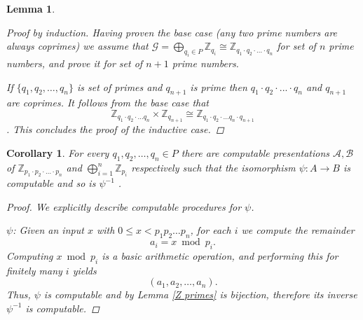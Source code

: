 \documentclass{pracalicmgr2025}
\theoremstyle{plain}            %
\newtheorem{lemma}[theorem]{Lemma}
\newtheorem{corollary}[theorem]{Corollary}
\theoremstyle{remark}           %
\theoremstyle{definition}       %
\begin{document}
\begin{lemma}
\begin{proof}[Proof by induction]
        Having proven the base case (any two prime numbers are always coprimes) we assume that $\mathcal{G} = \bigoplus_{q_i \in P}\mathbb{Z}_{q_i} \cong \mathbb{Z}_{q_1 \cdot q_2 \cdot... \cdot q_n}$ for set of $n$ prime numbers, and prove it for set of $n+1$ prime numbers. 
        
        If $\{q_1,q_2,\dots,q_n\}$ is set of primes and $q_{n+1}$ is prime then $q_1\cdot q_2\cdot...\cdot q_n$ and $q_{n+1}$ are coprimes. It follows from the base case that
        $$\mathbb{Z}_{q_1 \cdot q_2 \cdot...q_n} \times \mathbb{Z}_{q_{n+1}}\cong \mathbb{Z}_{q_1 \cdot q_2 \cdot...q_n\cdot q_{n+1}} $$.
        This concludes the proof of  the inductive case.
        
        
    \end{proof}
\end{lemma}

\begin{corollary}
For every $q_1,q_2,\dots,q_n \in P$ there are computable presentations $\mathcal{A},\mathcal{B}$ of $\mathbb{Z}_{p_1\cdot p_2 \cdot \dots \cdotp p_n}$ and $\bigoplus_{i=1}^{n} \mathbb{Z}_{p_i}$ respectively such that the isomorphism $\psi: A \to B$ is computable and so is $\psi^{-1}$ .
\begin{proof}
We explicitly describe computable procedures for $\psi$.

$\psi$: Given an input $x$ with $0 \le x < p_1p_2\dots p_n$, for each $i$ we compute the remainder 
$$
a_i = x \bmod p_i.
$$
Computing $x \bmod p_i$ is a basic arithmetic operation, and performing this for finitely many $i$ yields 
$$
(a_1, a_2, \dots, a_n).
$$
Thus, $\psi$ is computable and by Lemma \ref{Z primes} is bijection, therefore its inverse $\psi^{-1}$ is computable.

\end{proof}
\end{corollary}
\end{document}
